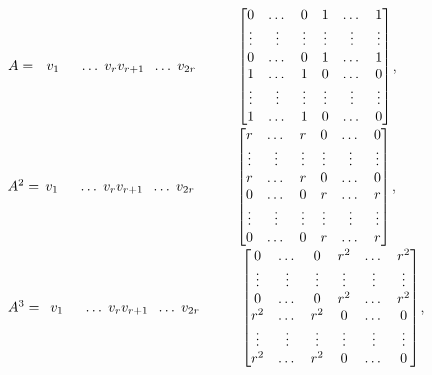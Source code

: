 \documentclass[12pt]{article}
\begin{document}
\newpage{} \\
$A = ~~v_1\hspace*{5mm}\dots\hspace*{1mm} v_rv_{r+1}\hspace*{2mm}\dots\hspace*{1mm}v_{2r}\\
\hspace*{10mm}\begin{bmatrix}
0&\dots&0&1&\dots&1\\
\vdots&\vdots&\vdots&\vdots&\vdots&\vdots\\
0&\dots&0&1&\dots&1\\
1&\dots&1&0&\dots&0\\
\vdots&\vdots&\vdots&\vdots&\vdots&\vdots\\
1&\dots&1&0&\dots&0\\
\end{bmatrix}$,\\
$A^2 = \,v_1\hspace*{5mm}\dots\hspace*{1mm} v_rv_{r+1}\hspace*{2mm}\dots\hspace*{1mm}v_{2r}\\
\hspace*{10mm}\begin{bmatrix}
r&\dots&r&0&\dots&0\\
\vdots&\vdots&\vdots&\vdots&\vdots&\vdots\\
r&\dots&r&0&\dots&0\\
0&\dots&0&r&\dots&r\\
\vdots&\vdots&\vdots&\vdots&\vdots&\vdots\\
0&\dots&0&r&\dots&r\\
\end{bmatrix}$,\\
$A^3 = \,\,\,v_1\hspace*{5mm}\dots\hspace*{1mm} v_rv_{r+1}\hspace*{2mm}\dots\hspace*{1mm}v_{2r}\\
\hspace*{10mm}\begin{bmatrix}
0&\dots&0&r^2&\dots&r^2\\
\vdots&\vdots&\vdots&\vdots&\vdots&\vdots\\
0&\dots&0&r^2&\dots&r^2\\
r^2&\dots&r^2&0&\dots&0\\
\vdots&\vdots&\vdots&\vdots&\vdots&\vdots\\
r^2&\dots&r^2&0&\dots&0\\
\end{bmatrix}$,\\
\end{document}
